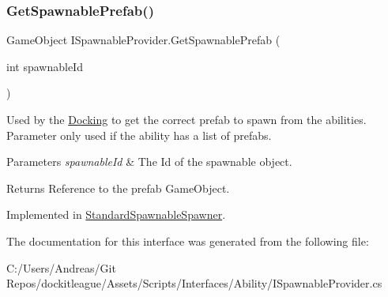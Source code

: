 \subsubsection{\texorpdfstring{Get\+Spawnable\+Prefab()}{GetSpawnablePrefab()}}
{\footnotesize\ttfamily Game\+Object I\+Spawnable\+Provider.\+Get\+Spawnable\+Prefab (\begin{DoxyParamCaption}\item[{int}]{spawnable\+Id }\end{DoxyParamCaption})}



Used by the \hyperlink{class_docking}{Docking} to get the correct prefab to spawn from the abilities. Parameter only used if the ability has a list of prefabs. 


\begin{DoxyParams}{Parameters}
{\em spawnable\+Id} & The Id of the spawnable object.\\
\hline
\end{DoxyParams}
\begin{DoxyReturn}{Returns}
Reference to the prefab Game\+Object.
\end{DoxyReturn}


Implemented in \hyperlink{class_standard_spawnable_spawner_afaadd0fd0cb2d16b40f979249747e9b1}{Standard\+Spawnable\+Spawner}.



The documentation for this interface was generated from the following file\+:\begin{DoxyCompactItemize}
\item 
C\+:/\+Users/\+Andreas/\+Git Repos/dockitleague/\+Assets/\+Scripts/\+Interfaces/\+Ability/I\+Spawnable\+Provider.\+cs\end{DoxyCompactItemize}

